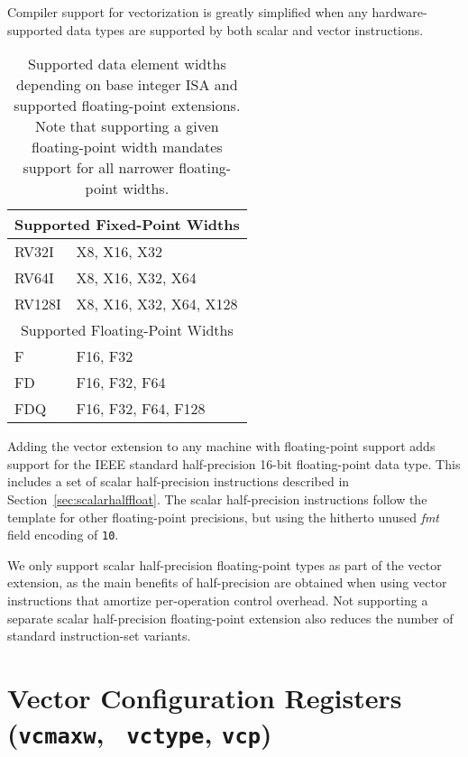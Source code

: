 \begin{commentary}
  Compiler support for vectorization is greatly simplified when any
  hardware-supported data types are supported by both scalar and
  vector instructions.
\end{commentary}

\begin{table}
  \centering
\begin{tabular}{|l|l|}
  \hline
  \multicolumn{2}{|c|}{Supported Fixed-Point Widths} \\
  \hline
  RV32I  & X8, X16, X32 \\
  RV64I  & X8, X16, X32, X64 \\
  RV128I & X8, X16, X32, X64, X128 \\
  \hline
  \hline
  \multicolumn{2}{|c|}{Supported Floating-Point Widths} \\
  \hline
  F      & F16, F32 \\
  FD     & F16, F32, F64 \\
  FDQ    & F16, F32, F64, F128 \\
  \hline
\end{tabular}
\caption{Supported data element widths depending on base integer ISA
  and supported floating-point extensions.  Note that supporting a
  given floating-point width mandates support for all narrower
  floating-point widths.}
\label{tab:velemtypes}
\end{table}

Adding the vector extension to any machine with floating-point support
adds support for the IEEE standard half-precision 16-bit
floating-point data type.  This includes a set of scalar
half-precision instructions described in
Section~\ref{sec:scalarhalffloat}.  The scalar half-precision
instructions follow the template for other floating-point precisions,
but using the hitherto unused {\em fmt} field encoding of {\tt 10}.

\begin{commentary}
  We only support scalar half-precision floating-point types as part
  of the vector extension, as the main benefits of half-precision are
  obtained when using vector instructions that amortize per-operation
  control overhead.  Not supporting a separate scalar half-precision
  floating-point extension also reduces the number of standard
  instruction-set variants.
\end{commentary}

\section{Vector Configuration Registers ({\tt vcmaxw}, {\tt
    vctype}, {\tt vcp})}

